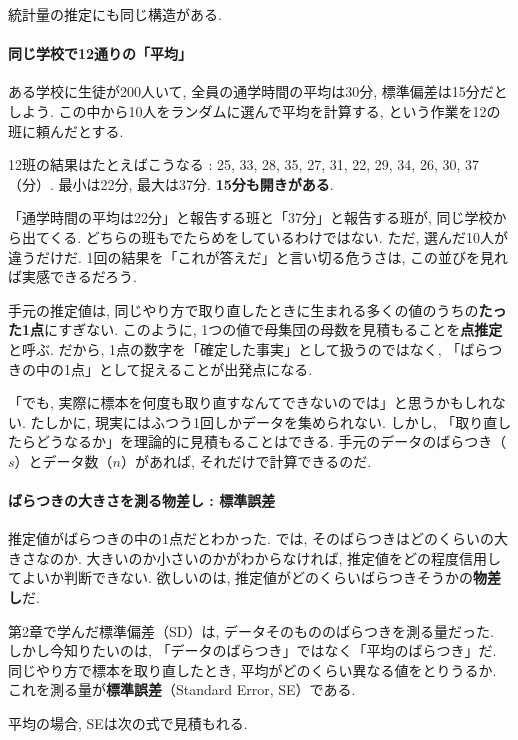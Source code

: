     統計量の推定にも同じ構造がある.

    \paragraph{同じ学校で12通りの「平均」}

    ある学校に生徒が200人いて, 全員の通学時間の平均は30分, 標準偏差は15分だとしよう.
    この中から10人をランダムに選んで平均を計算する, という作業を12の班に頼んだとする.

    12班の結果はたとえばこうなる :
    25, 33, 28, 35, 27, 31, 22, 29, 34, 26, 30, 37（分）.
    最小は22分, 最大は37分.
    \textbf{15分も開きがある}.

    「通学時間の平均は22分」と報告する班と「37分」と報告する班が, 同じ学校から出てくる.
    どちらの班もでたらめをしているわけではない.
    ただ, 選んだ10人が違うだけだ.
    1回の結果を「これが答えだ」と言い切る危うさは, この並びを見れば実感できるだろう.

    手元の推定値は, 同じやり方で取り直したときに生まれる多くの値のうちの\textbf{たった1点}にすぎない.
    このように, 1つの値で母集団の母数を見積もることを\textbf{点推定}と呼ぶ.
    だから, 1点の数字を「確定した事実」として扱うのではなく,
    「ばらつきの中の1点」として捉えることが出発点になる.

    「でも, 実際に標本を何度も取り直すなんてできないのでは」と思うかもしれない.
    たしかに, 現実にはふつう1回しかデータを集められない.
    しかし, 「取り直したらどうなるか」を理論的に見積もることはできる.
    手元のデータのばらつき（$s$）とデータ数（$n$）があれば, それだけで計算できるのだ.

    \paragraph{ばらつきの大きさを測る物差し : 標準誤差}

    推定値がばらつきの中の1点だとわかった.
    では, そのばらつきはどのくらいの大きさなのか.
    大きいのか小さいのかがわからなければ, 推定値をどの程度信用してよいか判断できない.
    欲しいのは, 推定値がどのくらいばらつきそうかの\textbf{物差し}だ.

    第2章で学んだ標準偏差（SD）は, データそのもののばらつきを測る量だった.
    しかし今知りたいのは, 「データのばらつき」ではなく「平均のばらつき」だ.
    同じやり方で標本を取り直したとき, 平均がどのくらい異なる値をとりうるか.
    これを測る量が\textbf{標準誤差}（Standard Error, SE）である.

    平均の場合, SEは次の式で見積もれる.

